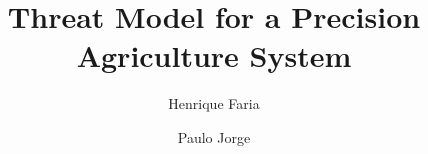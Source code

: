 \documentclass[runningheads]{llncs}
\title{Threat Model for a Precision Agriculture System}
\author{Henrique Faria \and Paulo Jorge}
\institute{Departamento de Informática, Universidade do Minho}
\begin{document}
 

\maketitle

\newpage
\hfill



\end{document}
